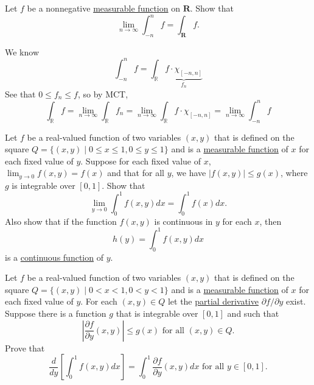   \begin{exercise}[Royden 4.34]
    Let $f$ be a nonnegative \hyperref[def:measurable-function]{measurable function} on $\mathbf{R}$. Show that
    \begin{equation*}
      \lim_{n \to \infty} \int_{-n}^n f = \int_{\mathbf{R}} f.
    \end{equation*}
  \end{exercise}
  \begin{solution}
    We know 
    \begin{equation}
      \int_{-n}^n f = \int_{\mathbb{R}} \underbrace{f \cdot \chi_{[-n, n]}}_{f_n}
    \end{equation}
    See that $0 \leq f_n \leq f$, so by MCT, 
    \begin{equation}
      \int_{\mathbb{R}} f = \lim_{n \to \infty} \int_{\mathbb{R}} f_n = \lim_{n \to \infty} \int_{\mathbb{R}} f \cdot \chi_{[-n, n]} = \lim_{n \to \infty} \int_{-n}^n f
    \end{equation}
  \end{solution}

  \begin{exercise}[Royden 4.35]
    Let $f$ be a real-valued function of two variables $(x, y)$ that is defined on the square $Q = \{(x, y) \mid 0 \leq x \leq 1, 0 \leq y \leq 1\}$ and is a \hyperref[def:measurable-function]{measurable function} of $x$ for each fixed value of $y$. Suppose for each fixed value of $x$, $\lim_{y \to 0} f(x, y) = f(x)$ and that for all $y$, we have $|f(x, y)| \leq g(x)$, where $g$ is integrable over $[0, 1]$. Show that
    \begin{equation*}
      \lim_{y \to 0} \int_0^1 f(x, y) dx = \int_0^1 f(x) dx.
    \end{equation*}
    Also show that if the function $f(x, y)$ is continuous in $y$ for each $x$, then
    \begin{equation*}
      h(y) = \int_0^1 f(x, y) dx
    \end{equation*}
    is a \hyperref[pst-def:continuous_func]{continuous function} of $y$.
  \end{exercise}

  \begin{exercise}[Royden 4.36]
    Let $f$ be a real-valued function of two variables $(x, y)$ that is defined on the square $Q = \{(x, y) \mid 0 < x < 1, 0 < y < 1\}$ and is a \hyperref[def:measurable-function]{measurable function} of $x$ for each fixed value of $y$. For each $(x, y) \in Q$ let the \hyperref[mv-def:partial-derivative]{partial derivative} $\partial f/\partial y$ exist. Suppose there is a function $g$ that is integrable over $[0, 1]$ and such that
    \begin{equation*}
      \left|\frac{\partial f}{\partial y}(x, y)\right| \leq g(x) \text{ for all } (x, y) \in Q.
    \end{equation*}
    Prove that
    \begin{equation*}
      \frac{d}{dy} \left[\int_0^1 f(x, y) dx\right] = \int_0^1 \frac{\partial f}{\partial y}(x, y) dx \text{ for all } y \in [0, 1].
    \end{equation*}
  \end{exercise}

